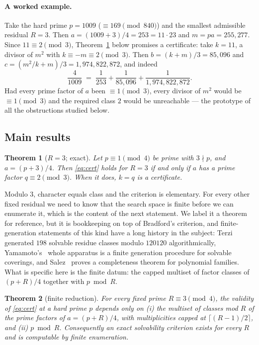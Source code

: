 \documentclass[11pt]{article}
\theoremstyle{plain}
\newtheorem{theorem}{Theorem}[section]
\theoremstyle{remark}
\theoremstyle{plain}
\numberwithin{equation}{section}
\begin{document}
\paragraph{A worked example.} Take the hard prime $p = 1009$
($\equiv 169 \pmod{840}$) and the smallest admissible residual $R = 3$.
Then $a = (1009+3)/4 = 253 = 11 \cdot 23$ and $m = pa = 255{,}277$.
Since $11 \equiv 2 \pmod 3$, Theorem~\ref{thm:A} below promises a
certificate: take $k = 11$, a divisor of $m^2$ with
$k \equiv -m \equiv 2 \pmod 3$. Then $b = (k+m)/3 = 85{,}096$ and
$c = (m^2/k+m)/3 = 1{,}974{,}822{,}872$, and indeed
\[
  \frac{4}{1009} \;=\; \frac{1}{253} + \frac{1}{85{,}096}
  + \frac{1}{1{,}974{,}822{,}872}.
\]
Had every prime factor of $a$ been $\equiv 1 \pmod 3$, every divisor of
$m^2$ would be $\equiv 1 \pmod 3$ and the required class $2$ would be
unreachable --- the prototype of all the obstructions studied below.

\subsection{Main results}

\begin{theorem}[$R=3$; exact]\label{thm:A}
Let $p \equiv 1 \pmod 4$ be prime with $3 \nmid p$, and $a = (p+3)/4$. Then
\eqref{eq:cert} holds for $R = 3$ if and only if $a$ has a prime factor
$q \equiv 2 \pmod 3$. When it does, $k = q$ is a certificate.
\end{theorem}

Modulo $3$, character equals class and the criterion is elementary.
For every other fixed residual we need to know that the search space
is finite before we can enumerate it, which is the content of the
next statement. We label it a theorem for reference, but it is
bookkeeping on top of Bradford's criterion, and finite-generation
statements of this kind have a long history in the subject:
Terzi~\cite{Terzi} generated $198$ solvable residue classes modulo
$120120$ algorithmically, Yamamoto's~\cite[\S3]{Yamamoto} whole
apparatus is a finite generation procedure for solvable coverings,
and Salez~\cite{Salez} proves a completeness theorem for polynomial
families. What is specific here is the finite datum: the capped
multiset of factor classes of $(p+R)/4$ together with $p \bmod R$.

\begin{theorem}[finite reduction]\label{thm:meta}
For every fixed prime $R \equiv 3 \pmod 4$, the validity of
\eqref{eq:cert} at a hard prime $p$ depends only on \textup{(i)} the
multiset of classes mod $R$ of the prime factors of $a = (p+R)/4$, with
multiplicities capped at $\lceil (R-1)/2 \rceil$, and \textup{(ii)}
$p \bmod R$. Consequently an exact solvability criterion exists for every
$R$ and is computable by finite enumeration.
\end{theorem}
\end{document}

